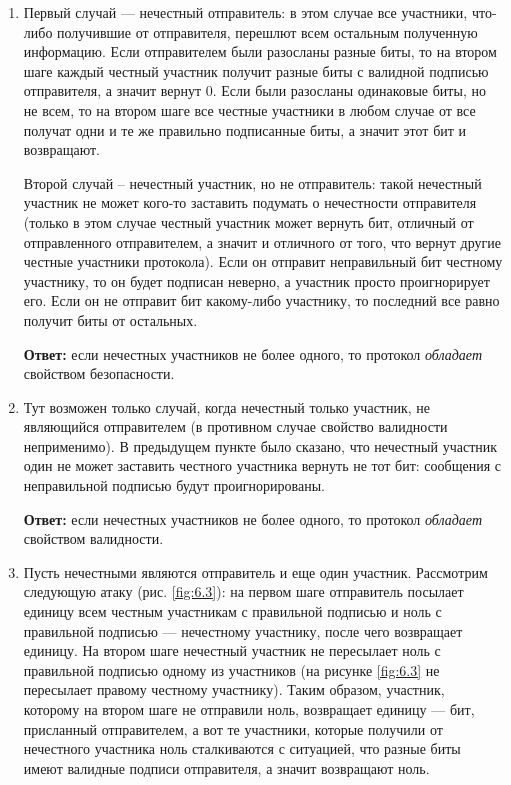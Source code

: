 \documentclass[12pt, a4paper]{extarticle}
\newcommand{\Answer}[1]{\textbf{Ответ:} #1}
\begin{document}
\begin{enumerate}
    \item Первый случай --- нечестный отправитель: в этом случае все участники, что-либо получившие от 
        отправителя, перешлют всем остальным полученную информацию. Если отправителем были разосланы 
        разные биты, то на втором шаге каждый честный участник получит разные биты с валидной подписью 
        отправителя, а значит вернут 0. Если были разосланы одинаковые биты, но не всем, то на втором 
        шаге все честные участники в любом случае от все получат одни и те же правильно подписанные биты,
        а значит этот бит и возвращают.
        
        Второй случай -- нечестный участник, но не отправитель: такой нечестный участник не может кого-то
        заставить подумать о нечестности отправителя (только в этом случае честный участник может вернуть
        бит, отличный от отправленного отправителем, а значит и отличного от того, что вернут другие честные
        участники протокола). Если он отправит неправильный бит честному участнику, то он будет подписан 
        неверно, а участник просто проигнорирует его. Если он не отправит бит какому-либо участнику, то 
        последний все равно получит биты от остальных.
        
        \Answer{если нечестных участников не более одного, то протокол \textit{обладает} свойством 
            безопасности.}
        
    \item Тут возможен только случай, когда нечестный только участник, не являющийся отправителем (в противном
        случае свойство валидности неприменимо). В предыдущем пункте было сказано, что нечестный участник
        один не может заставить честного участника вернуть не тот бит: сообщения с неправильной подписью
        будут проигнорированы.
        
        \Answer{если нечестных участников не более одного, то протокол \textit{обладает} свойством 
            валидности.}
        
    \item Пусть нечестными являются отправитель и еще один участник. Рассмотрим следующую атаку (рис. 
        \ref{fig:6.3}): на первом шаге отправитель посылает единицу всем честным участникам с правильной
        подписью и ноль с правильной подписью --- нечестному участнику, после чего возвращает единицу. На
        втором шаге нечестный участник не пересылает ноль с правильной подписью одному из участников (на
        рисунке \ref{fig:6.3} не пересылает правому честному участнику). Таким образом, участник, которому
        на втором шаге не отправили ноль, возвращает единицу --- бит, присланный отправителем, а вот те
        участники, которые получили от нечестного участника ноль сталкиваются с ситуацией, что разные биты
        имеют валидные подписи отправителя, а значит возвращают ноль.
        

\end{enumerate}
\end{document}
